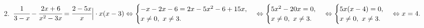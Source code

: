 2. $\cfrac{1}{3-x}-\cfrac{2x+6}{x^2-3x}=\cfrac{2-5x}{x}\Big|\cdot x(x-3)\Leftrightarrow
\begin{cases}
-x-2x-6=2x-5x^2-6+15x,\\
x\neq0,\ x\neq 3.\end{cases}\Leftrightarrow\begin{cases}
5x^2-20x=0,\\
x\neq0,\ x\neq 3.\end{cases}\Leftrightarrow\begin{cases}
5x(x-4)=0,\\
x\neq0,\ x\neq 3.\end{cases}\Leftrightarrow x=4.$\\
